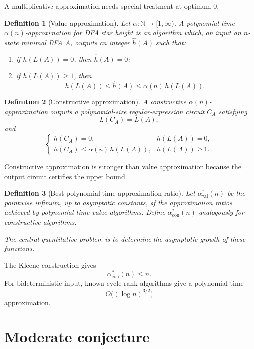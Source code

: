 \documentclass[11pt]{article}
\newtheorem{definition}{Definition}
\begin{document}
A multiplicative approximation needs special treatment at optimum $0$.

\begin{definition}[Value approximation]
Let $\alpha:\mathbb N\to[1,\infty)$. A polynomial-time
$\alpha(n)$-approximation for DFA star height is an algorithm which, on input
an $n$-state minimal DFA $A$, outputs an integer $\widehat h(A)$ such that:
\begin{enumerate}[label=(\roman*)]
  \item if $h(L(A))=0$, then $\widehat h(A)=0$;
  \item if $h(L(A))\geq1$, then
  \[
    h(L(A))
    \leq \widehat h(A)
    \leq \alpha(n)\,h(L(A)).
  \]
\end{enumerate}
\end{definition}

\begin{definition}[Constructive approximation]
A constructive $\alpha(n)$-approximation outputs a polynomial-size
regular-expression circuit $C_A$ satisfying
\[
 L(C_A)=L(A),
\]
and
\[
\begin{cases}
h(C_A)=0,&h(L(A))=0,\\[2mm]
h(C_A)\leq\alpha(n)\,h(L(A)),&h(L(A))\geq1.
\end{cases}
\]
\end{definition}

Constructive approximation is stronger than value approximation because the
output circuit certifies the upper bound.

\begin{definition}[Best polynomial-time approximation ratio]
Let $\alpha_{\mathrm{val}}^*(n)$ be the pointwise infimum, up to asymptotic
constants, of the approximation ratios achieved by polynomial-time value
algorithms. Define $\alpha_{\mathrm{con}}^*(n)$ analogously for constructive
algorithms.

The central quantitative problem is to determine the asymptotic growth of
these functions.
\end{definition}

The Kleene construction gives
\[
 \alpha_{\mathrm{con}}^*(n)\leq n.
\]
For bideterministic input, known cycle-rank algorithms give a polynomial-time
\[
 O\bigl((\log n)^{3/2}\bigr)
\]
approximation.

\section{Moderate conjecture}
\end{document}
